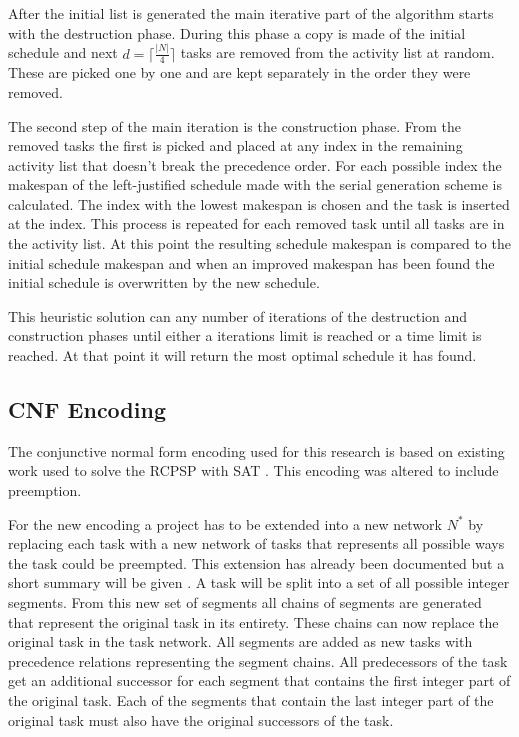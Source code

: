 After the initial list is generated the main iterative part of the algorithm starts with the destruction phase. During this phase a copy is made of the initial schedule and next \(d=\lceil\frac{|N|}{4}\rceil\)  tasks are removed from the activity list at random. These are picked one by one and are kept separately in the order they were removed.

The second step of the main iteration is the construction phase. From the removed tasks the first is picked and placed at any index in the remaining activity list that doesn't break the precedence order. For each possible index the makespan of the left-justified schedule made with the serial generation scheme is calculated. The index with the lowest makespan is chosen and the task is inserted at the index. This process is repeated for each removed task until all tasks are in the activity list. At this point the resulting schedule makespan is compared to the initial schedule makespan and when an improved makespan has been found the initial schedule is overwritten by the new schedule.

This heuristic solution can any number of iterations of the destruction and construction phases until either a iterations limit is reached or a time limit is reached. At that point it will return the most optimal schedule it has found.


\subsection{CNF Encoding}
The conjunctive normal form encoding used for this research is based on existing work used to solve the RCPSP with SAT \cite{RN17}. This encoding was altered to include preemption.

For the new encoding a project has to be extended into a new network \(N^*\) by replacing each task with a new network of tasks that represents all possible ways the task could be preempted. This extension has already been documented but a short summary will be given \cite{RN1}. A task will be split into a set of all possible integer segments. From this new set of segments all chains of segments are generated that represent the original task in its entirety. These chains can now replace the original task in the task network. All segments are added as new tasks with precedence relations representing the segment chains. All predecessors of the task get an additional successor for each segment that contains the first integer part of the original task. Each of the segments that contain the last integer part of the original task must also have the original successors of the task.

